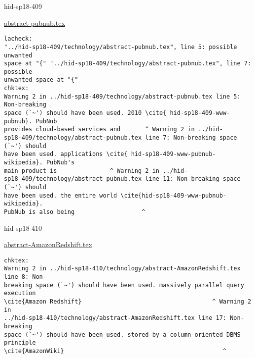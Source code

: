 \begin{IU}

hid-sp18-409

\href{https://github.com/cloudmesh-community/hid-sp18-409/blob/master//technology/abstract-pubnub.tex}{abstract-pubnub.tex}

\begin{tiny}
\begin{verbatim}
lacheck:
"../hid-sp18-409/technology/abstract-pubnub.tex", line 5: possible unwanted
space at "{" "../hid-sp18-409/technology/abstract-pubnub.tex", line 7: possible
unwanted space at "{"
chktex:
Warning 2 in ../hid-sp18-409/technology/abstract-pubnub.tex line 5: Non-breaking
space (`~') should have been used. 2010 \cite{ hid-sp18-409-www-pubnub}. PubNub
provides cloud-based services and       ^ Warning 2 in ../hid-
sp18-409/technology/abstract-pubnub.tex line 7: Non-breaking space (`~') should
have been used. applications \cite{ hid-sp18-409-www-pubnub-wikipedia}. PubNub's
main product is               ^ Warning 2 in ../hid-
sp18-409/technology/abstract-pubnub.tex line 11: Non-breaking space (`~') should
have been used. the entire world \cite{hid-sp18-409-www-pubnub-wikipedia}.
PubNub is also being                   ^
\end{verbatim}
\end{tiny}
\end{IU}



\begin{IU}

hid-sp18-410

\href{https://github.com/cloudmesh-community/hid-sp18-410/blob/master//technology/abstract-AmazonRedshift.tex}{abstract-AmazonRedshift.tex}

\begin{tiny}
\begin{verbatim}
chktex:
Warning 2 in ../hid-sp18-410/technology/abstract-AmazonRedshift.tex line 8: Non-
breaking space (`~') should have been used. massively parallel query execution
\cite{Amazon Redshift}                                     ^ Warning 2 in
../hid-sp18-410/technology/abstract-AmazonRedshift.tex line 17: Non-breaking
space (`~') should have been used. stored by a column-oriented DBMS principle
\cite{AmazonWiki}                                             ^
\end{verbatim}
\end{tiny}
\end{IU}

